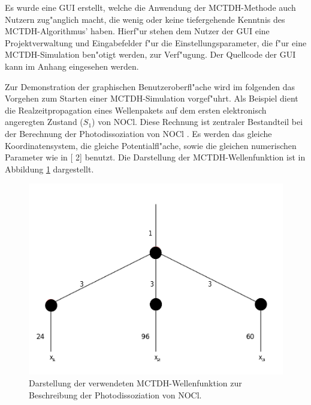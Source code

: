 Es wurde eine GUI erstellt, welche die Anwendung der MCTDH-Methode auch Nutzern zug"anglich macht, die wenig oder keine 
tiefergehende Kenntnis des MCTDH-Algorith\-mus' haben. Hierf"ur stehen dem Nutzer der GUI eine Projektverwaltung und 
Eingabefelder f"ur die Einstellungsparameter, die f"ur eine MCTDH-Simulation ben"otigt werden, zur
Verf"ugung. 
Der Quellcode der GUI kann im Anhang eingesehen werden.

Zur Demonstration der graphischen Benutzeroberfl"ache wird im folgenden das Vorgehen zum Starten einer 
MCTDH-Simulation vorgef"uhrt. Als Beispiel dient die Realzeitpro\-pagation eines Wellenpakets auf dem
ersten elektronisch angeregten Zustand ($S_1$) von NOCl. 
Diese Rechnung ist zentraler Bestandteil bei der Berechnung der Photodisso\-ziation von NOCl \cite{MMC1}.
Es werden das gleiche Koordinatensystem, die gleiche Potentialfl"ache, sowie die gleichen numerischen Parameter wie in
[{\color{darkblue} 2}] benutzt.
Die Darstellung der MCTDH-Wellenfunktion ist in Abbildung \ref{fig:NOCl} dargestellt. 

\begin{figure}
    \centering
    \includegraphics[scale=0.5]{figures/NOCl}
    \caption{Darstellung der verwendeten MCTDH-Wellenfunktion zur Beschreibung der Photodissoziation von NOCl.}\label{fig:NOCl}
\end{figure}


